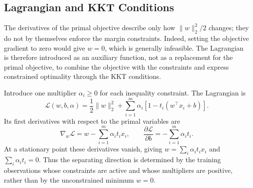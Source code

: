 \documentclass[11pt,a4paper]{article}
\numberwithin{equation}{section} %
\begin{document}
\subsection{Lagrangian and KKT Conditions}

The derivatives of the primal objective describe only how
$\lVert w\rVert_2^2/2$ changes; they do not by themselves enforce the margin
constraints. Indeed, setting the objective gradient to zero would give
$w=0$, which is generally infeasible. The Lagrangian is therefore introduced
as an auxiliary function, not as a replacement for the primal objective, to
combine the objective with the constraints and express constrained
optimality through the KKT conditions.

Introduce one multiplier $\alpha_i\geq0$ for each inequality constraint. The Lagrangian is
\begin{equation}
    \mathcal{L}(w,b,\alpha)
    =\frac{1}{2}\lVert w\rVert_2^2
    +\sum_{i=1}^{m}\alpha_i\left[1-t_i(w^\top x_i+b)\right].
\end{equation}
Its first derivatives with respect to the primal variables are
\begin{equation}
    \nabla_w\mathcal{L}
    =w-\sum_{i=1}^{m}\alpha_i t_i x_i,
    \qquad
    \frac{\partial\mathcal{L}}{\partial b}
    =-\sum_{i=1}^{m}\alpha_i t_i.
\end{equation}
At a stationary point these derivatives vanish, giving
$w=\sum_i\alpha_i t_i x_i$ and $\sum_i\alpha_i t_i=0$. Thus the separating
direction is determined by the training observations whose constraints are
active and whose multipliers are positive, rather than by the unconstrained
minimum $w=0$.
\end{document}
